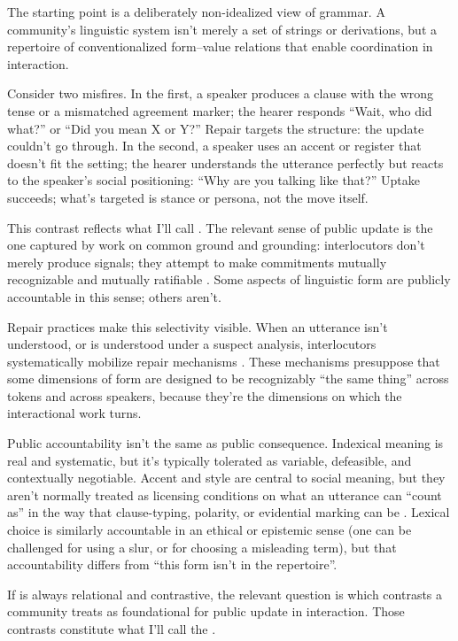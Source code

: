 \documentclass[12pt,letterpaper]{article}
\begin{document}
The starting point is a deliberately non-idealized view of grammar. A community's linguistic system isn't merely a set of strings or derivations, but a repertoire of conventionalized form--value relations that enable coordination in interaction.

Consider two misfires. In the first, a speaker produces a clause with the wrong tense or a mismatched agreement marker; the hearer responds \enquote{Wait, who did what?} or \enquote{Did you mean X or Y?} Repair targets the structure: the update couldn't go through. In the second, a speaker uses an accent or register that doesn't fit the setting; the hearer understands the utterance perfectly but reacts to the speaker's social positioning: \enquote{Why are you talking like that?} Uptake succeeds; what's targeted is stance or persona, not the move itself.

This contrast reflects what I'll call . The relevant sense of public update is the one captured by work on common ground and grounding: interlocutors don't merely produce signals; they attempt to make commitments mutually recognizable and mutually ratifiable \citep{stalnaker1978,stalnaker2002,clarkbrennan1991,clark1996}. Some aspects of linguistic form are publicly accountable in this sense; others aren't.

Repair practices make this selectivity visible. When an utterance isn't understood, or is understood under a suspect analysis, interlocutors systematically mobilize repair mechanisms \citep{schegloffjeffersonsacks1977}. These mechanisms presuppose that some dimensions of form are designed to be recognizably \enquote{the same thing} across tokens and across speakers, because they're the dimensions on which the interactional work turns.

Public accountability isn't the same as public consequence. Indexical meaning is real and systematic, but it's typically tolerated as variable, defeasible, and contextually negotiable. Accent and style are central to social meaning, but they aren't normally treated as licensing conditions on what an utterance can \enquote{count as} in the way that clause-typing, polarity, or evidential marking can be \citep{eckert2008,eckert2012,agha2007,coupland2007}. Lexical choice is similarly accountable in an ethical or epistemic sense (one can be challenged for using a slur, or for choosing a misleading term), but that accountability differs from \enquote{this form isn't in the repertoire}.

If  is always relational and contrastive, the relevant question is which contrasts a community treats as foundational for public update in interaction. Those contrasts constitute what I'll call the .
\end{document}
